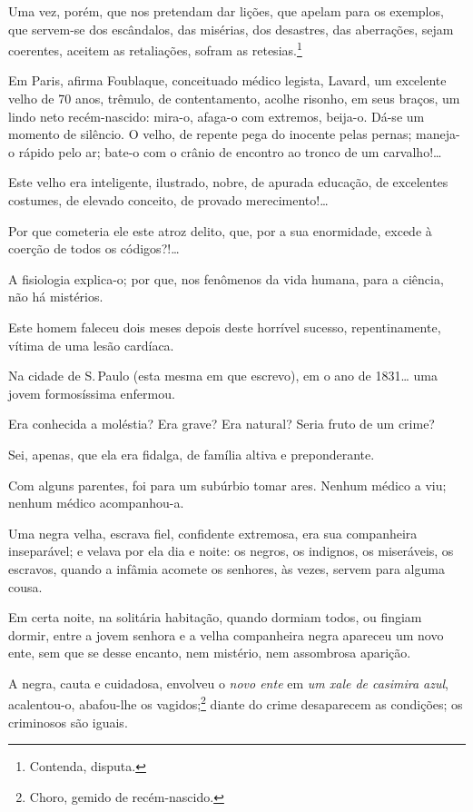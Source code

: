 {Uma vez, porém, que nos pretendam dar lições, que apelam para os
exemplos, que servem-se dos escândalos, das misérias, dos desastres, das
aberrações, sejam coerentes, aceitem as retaliações, sofram as
retesias.\footnote{Contenda, disputa.}

\asterisc

Em Paris, afirma Foublaque, conceituado médico legista, Lavard, um
excelente velho de 70 anos, trêmulo, de contentamento, acolhe risonho,
em seus braços, um lindo neto recém-nascido: mira-o, afaga-o com
extremos, beija-o. Dá-se um momento de silêncio. O velho, de repente
pega do inocente pelas pernas; maneja-o rápido pelo ar; bate-o com o
crânio de encontro ao tronco de um carvalho!\ldots{}

Este velho era inteligente, ilustrado, nobre, de apurada educação, de
excelentes costumes, de elevado conceito, de provado merecimento!\ldots{}

Por que cometeria ele este atroz delito, que, por a sua enormidade,
excede à coerção de todos os códigos?!\ldots{}

A fisiologia explica-o; por que, nos fenômenos da vida humana, para a
ciência, não há mistérios.

Este homem faleceu dois meses depois deste horrível sucesso,
repentinamente, vítima de uma lesão cardíaca.

\asterisc

Na cidade de S.\,Paulo (esta mesma em que escrevo), em o ano de
1831\ldots{} uma jovem formosíssima enfermou.

Era conhecida a moléstia? Era grave? Era natural? Seria fruto de um
crime?

Sei, apenas, que ela era fidalga, de família altiva e preponderante.

Com alguns parentes, foi para um subúrbio tomar ares. Nenhum médico a
viu; nenhum médico acompanhou-a.

Uma negra velha, escrava fiel, confidente extremosa, era sua companheira
inseparável; e velava por ela dia e noite: os negros, os indignos, os
miseráveis, os escravos, quando a infâmia acomete os senhores, às vezes,
servem para alguma cousa.

Em certa noite, na solitária habitação, quando dormiam todos, ou fingiam
dormir, entre a jovem senhora e a velha companheira negra apareceu um
novo ente, sem que se desse encanto, nem mistério, nem assombrosa
aparição.

A negra, cauta e cuidadosa, envolveu o \emph{novo ente} em \emph{um xale
de casimira azul}, acalentou-o, abafou-lhe os vagidos;\footnote{Choro,
  gemido de recém-nascido.} diante do crime desaparecem as condições;
os criminosos são iguais.

}
